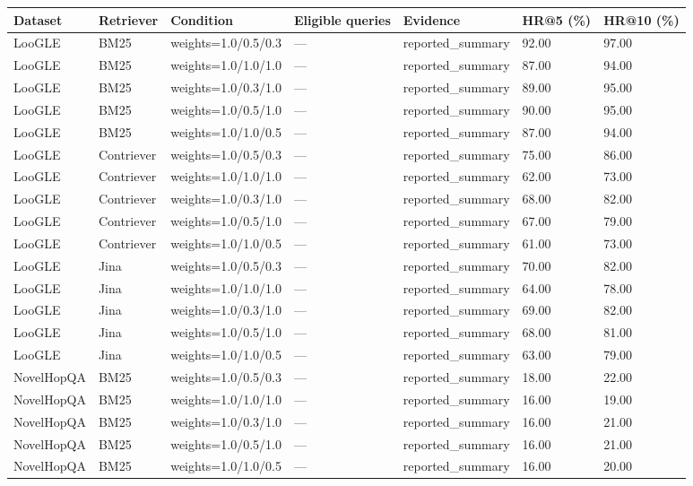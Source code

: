 \begin{tabular}{lllllll}
\hline
Dataset & Retriever & Condition & Eligible queries & Evidence & HR@5 (\%) & HR@10 (\%) \\
\hline
LooGLE & BM25 & weights=1.0/0.5/0.3 & — & reported\_summary & 92.00 & 97.00 \\
LooGLE & BM25 & weights=1.0/1.0/1.0 & — & reported\_summary & 87.00 & 94.00 \\
LooGLE & BM25 & weights=1.0/0.3/1.0 & — & reported\_summary & 89.00 & 95.00 \\
LooGLE & BM25 & weights=1.0/0.5/1.0 & — & reported\_summary & 90.00 & 95.00 \\
LooGLE & BM25 & weights=1.0/1.0/0.5 & — & reported\_summary & 87.00 & 94.00 \\
LooGLE & Contriever & weights=1.0/0.5/0.3 & — & reported\_summary & 75.00 & 86.00 \\
LooGLE & Contriever & weights=1.0/1.0/1.0 & — & reported\_summary & 62.00 & 73.00 \\
LooGLE & Contriever & weights=1.0/0.3/1.0 & — & reported\_summary & 68.00 & 82.00 \\
LooGLE & Contriever & weights=1.0/0.5/1.0 & — & reported\_summary & 67.00 & 79.00 \\
LooGLE & Contriever & weights=1.0/1.0/0.5 & — & reported\_summary & 61.00 & 73.00 \\
LooGLE & Jina & weights=1.0/0.5/0.3 & — & reported\_summary & 70.00 & 82.00 \\
LooGLE & Jina & weights=1.0/1.0/1.0 & — & reported\_summary & 64.00 & 78.00 \\
LooGLE & Jina & weights=1.0/0.3/1.0 & — & reported\_summary & 69.00 & 82.00 \\
LooGLE & Jina & weights=1.0/0.5/1.0 & — & reported\_summary & 68.00 & 81.00 \\
LooGLE & Jina & weights=1.0/1.0/0.5 & — & reported\_summary & 63.00 & 79.00 \\
NovelHopQA & BM25 & weights=1.0/0.5/0.3 & — & reported\_summary & 18.00 & 22.00 \\
NovelHopQA & BM25 & weights=1.0/1.0/1.0 & — & reported\_summary & 16.00 & 19.00 \\
NovelHopQA & BM25 & weights=1.0/0.3/1.0 & — & reported\_summary & 16.00 & 21.00 \\
NovelHopQA & BM25 & weights=1.0/0.5/1.0 & — & reported\_summary & 16.00 & 21.00 \\
NovelHopQA & BM25 & weights=1.0/1.0/0.5 & — & reported\_summary & 16.00 & 20.00 \\

\end{tabular}
